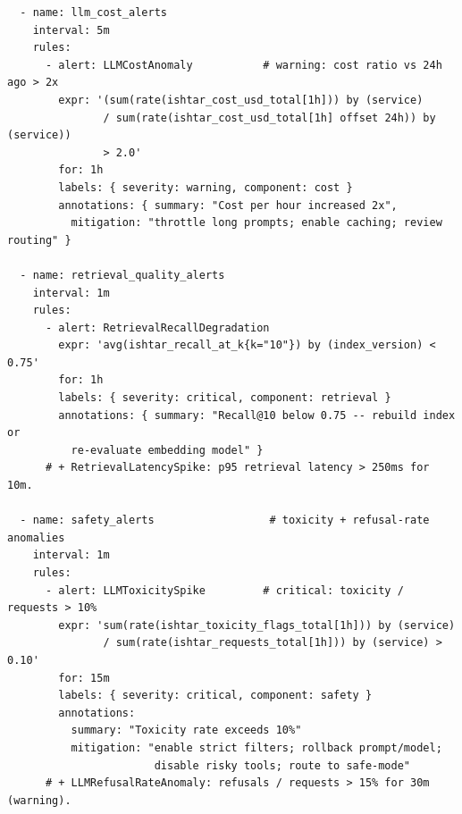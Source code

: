 \begin{codebox}
\begin{verbatim}
  - name: llm_cost_alerts
    interval: 5m
    rules:
      - alert: LLMCostAnomaly           # warning: cost ratio vs 24h ago > 2x
        expr: '(sum(rate(ishtar_cost_usd_total[1h])) by (service)
               / sum(rate(ishtar_cost_usd_total[1h] offset 24h)) by (service))
               > 2.0'
        for: 1h
        labels: { severity: warning, component: cost }
        annotations: { summary: "Cost per hour increased 2x",
          mitigation: "throttle long prompts; enable caching; review routing" }

  - name: retrieval_quality_alerts
    interval: 1m
    rules:
      - alert: RetrievalRecallDegradation
        expr: 'avg(ishtar_recall_at_k{k="10"}) by (index_version) < 0.75'
        for: 1h
        labels: { severity: critical, component: retrieval }
        annotations: { summary: "Recall@10 below 0.75 -- rebuild index or
          re-evaluate embedding model" }
      # + RetrievalLatencySpike: p95 retrieval latency > 250ms for 10m.

  - name: safety_alerts                  # toxicity + refusal-rate anomalies
    interval: 1m
    rules:
      - alert: LLMToxicitySpike         # critical: toxicity / requests > 10%
        expr: 'sum(rate(ishtar_toxicity_flags_total[1h])) by (service)
               / sum(rate(ishtar_requests_total[1h])) by (service) > 0.10'
        for: 15m
        labels: { severity: critical, component: safety }
        annotations:
          summary: "Toxicity rate exceeds 10%"
          mitigation: "enable strict filters; rollback prompt/model;
                       disable risky tools; route to safe-mode"
      # + LLMRefusalRateAnomaly: refusals / requests > 15% for 30m (warning).
\end{verbatim}
\end{codebox}

